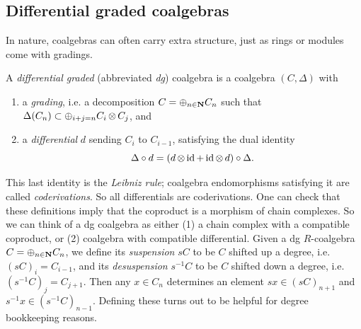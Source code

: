 \subsection{Differential graded coalgebras}
In nature, coalgebras can often carry extra structure, just as rings or modules come with gradings. 
\begin{defn}
A \emph{differential graded} (abbreviated \emph{dg}) coalgebra is a coalgebra $(C, \Delta)$ with 
\begin{enumerate}
  \item a \emph{grading}, i.e. a decomposition $C = \oplus_{n \in \mathbf{N}} C_n$ such that $\Delta(C_n)\subset \oplus_{i+j=n} C_i \operatorname{\otimes} C_j$, and
  \item a \emph{differential} $d$ sending $C_i$ to $C_{i-1}$, satisfying the dual identity
  \[\Delta \circ d = (d\operatorname{\otimes} \operatorname{id} + \operatorname{id} \operatorname{\otimes} d) \circ \Delta.\]
\end{enumerate}
\end{defn}
This last identity is the \emph{Leibniz rule}; coalgebra endomorphisms satisfying it are called \emph{coderivations}. So all differentials are coderivations. One can check that these definitions imply that the coproduct is a morphism of chain complexes. So we can think of a dg coalgebra as either (1) a chain complex with a compatible coproduct, or (2) coalgebra with compatible differential. 
Given a dg $R$-coalgebra $C=\oplus_{n \in \mathbf{N}} C_n$, we define its \emph{suspension} $sC$ to be $C$ shifted up a degree, i.e. $(sC)_i = C_{i-1}$, and its \emph{desuspension} $s^{-1}C$ to be $C$ shifted down a degree, i.e. $(s^{-1}C)_j = C_{j+1}$. Then any $x \in C_n$ determines an element $sx \in (sC)_{n+1}$ and $s^{-1}x \in (s^{-1}C)_{n-1}$. Defining these turns out to be helpful for degree bookkeeping reasons.

